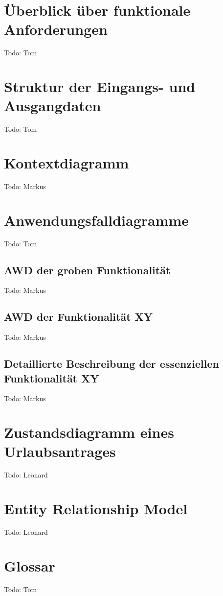 \chapter{Überblick über funktionale Anforderungen}
Todo: Tom
\chapter{Struktur der Eingangs- und Ausgangdaten}
Todo: Tom
\chapter{Kontextdiagramm}
Todo: Markus
\chapter{Anwendungsfalldiagramme}
Todo: Tom
\section{AWD der groben Funktionalität}
Todo: Markus
\section{AWD der Funktionalität XY}
Todo: Markus
\section{Detaillierte Beschreibung der essenziellen Funktionalität XY}
Todo: Markus
\chapter{Zustandsdiagramm eines Urlaubsantrages}
Todo: Leonard
\chapter{Entity Relationship Model}
Todo: Leonard
\chapter{Glossar}
Todo: Tom

% 
% 

\clearpage
\thispagestyle{empty}


